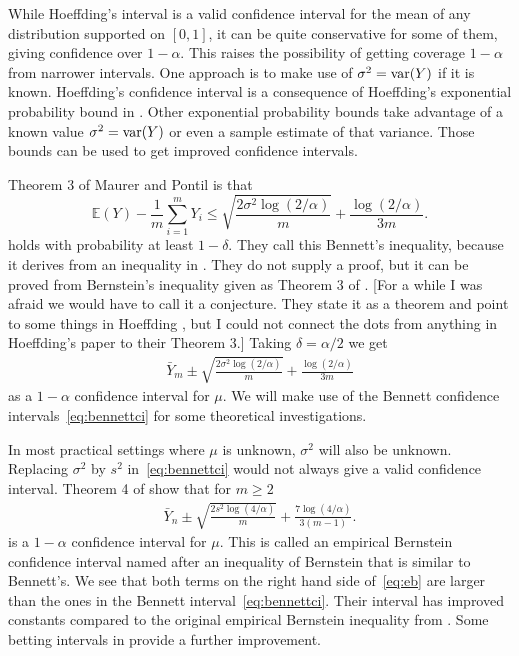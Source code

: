 \documentclass{article}
\newcommand{\art}[1]{\begingroup\color{blue}#1\endgroup}
\renewcommand{\le}{\leqslant}
\renewcommand{\ge}{\geqslant}
\newcommand{\e}{\mathbb{E}}
\begin{document}
While Hoeffding's interval is a valid confidence interval
for the mean of any distribution supported on $[0,1]$,
it can be quite conservative for some
of them, giving confidence over $1-\alpha$. This raises
the possibility of getting coverage $1-\alpha$ from
narrower intervals.  
One approach is to make use of 
$\sigma^2=\operatorname{var}(Y)$ if it is known. 
Hoeffding's confidence interval is a consequence of
Hoeffding's exponential probability bound in \cite{hoef:1963}.
Other exponential probability bounds take advantage of
a known value $\sigma^2=\operatorname{var}(Y)$ or even a sample estimate
of that variance.  Those bounds can be used to get
improved confidence intervals.

Theorem 3 of Maurer and Pontil \cite{maurer2009empirical}
is that
$$
\e(Y) - \frac1m\sum_{i=1}^mY_i \le \sqrt{\frac{2\sigma^2\log(2/\alpha)}m}
+ \frac{\log(2/\alpha)}{3m}.
  $$
holds with probability at least $1-\delta$.
They call this Bennett's inequality, because it derives
from an inequality in \cite{benn:1962}. 
\art{They do not supply a proof, but it can be proved from Bernstein's
inequality given as Theorem 3 of \cite{bouc:lugo:bous:2003}.}
\art{[For a while I was afraid we would have to call it a conjecture.
They state it as a theorem and point to some things in
Hoeffding \cite{hoef:1963}, but I could not connect the dots
from anything in Hoeffding's paper to their Theorem 3.]}
Taking $\delta =\alpha/2$ we get
\begin{align}\label{eq:bennettci}
\bar Y_m \pm \sqrt{\frac{2\sigma^2\log(2/\alpha)}m}
+ \frac{\log(2/\alpha)}{3m}
\end{align}
as a $1-\alpha$ confidence interval for $\mu$.
We will make use of the Bennett confidence
intervals~\eqref{eq:bennettci} for some
theoretical investigations. 

In most practical settings where $\mu$ is unknown,
$\sigma^2$ will also be unknown. Replacing $\sigma^2$
by $s^2$ in~\eqref{eq:bennettci} would not always
give a valid confidence interval.  
Theorem 4 of \cite{maurer2009empirical} show that
for $m\ge2$
\begin{align}\label{eq:eb}
    \bar Y_n\pm
\sqrt{\frac{2s^2\log(4/\alpha)}m}
+ \frac{7\log(4/\alpha)}{3(m-1)}.
\end{align}
is a $1-\alpha$ confidence interval for $\mu$.
This is called an empirical Bernstein confidence
interval named after an inequality of Bernstein
that is similar to Bennett's.  We see that both terms
on the right hand side of~\eqref{eq:eb} are larger
than the ones in the Bennett interval~\eqref{eq:bennettci}.
Their interval has improved constants compared to the original
empirical Bernstein inequality from
\cite{audi:muno:szep:2007}. Some betting intervals
in \cite{WauRam24a} provide a further improvement.
\end{document}
